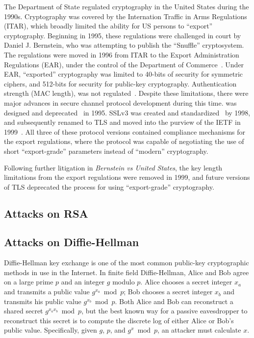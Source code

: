 
The Department of State regulated cryptography in the United States during
the 1990s. Cryptography was covered by the Internation Traffic in Arms
Regulations (ITAR), which broadly limited the ability for US persons to
``export'' cryptography. Beginning in 1995, these regulations were challenged
in court by Daniel J. Bernstein, who was attempting to publish the
``Snuffle'' cryptosystem. The regulations were moved in 1996 from ITAR to the
Export Administration Regulations (EAR), under the control of the Department
of Commerce~\cite{djb-case-status}. Under EAR, ``exported'' cryptography was
limited to 40-bits of security for symmetric ciphers, and 512-bits for
security for public-key cryptography. Authentication strength (\eg MAC
length), was not regulated~\cite{ear-2001-cat-5}. Despite these limitations,
there were major advances in secure channel protocol development during this time.
\ssltwo was designed and deprecated~\cite{sslv2} in 1995. SSLv3 was created and
standardized~\cite{rfc6101} by 1998, and subsequently renamed to TLS and
moved into the purview of the IETF in 1999~\cite{rfc2246}. All three of these
protocol versions contained compliance mechanisms for the export regulations,
where the protocol was capable of negotiating the use of short
``export-grade'' parameters instead of ``modern'' cryptography.

Following further litigation in \textit{Bernstein vs United States}, the key
length limitations from the export regulations were removed in 1999, and
future versions of TLS deprecated the process for using ``export-grade''
cryptography.

\subsection{Attacks on RSA}



\subsection{Attacks on Diffie-Hellman}

Diffie-Hellman key exchange is one of the most common public-key
cryptographic methods in use in the Internet. In finite field Diffie-Hellman,
Alice and Bob agree on a large prime $p$ and an integer $g$ modulo $p$. Alice
chooses a secret integer $x_a$ and transmits a public value $g^{x_a} \bmod
p$; Bob chooses a secret integer $x_b$ and transmits his public value
$g^{x_b} \bmod p$. Both Alice and Bob can reconstruct a shared secret $g^{x_a
x_b} \bmod p$, but the best known way for a passive eavesdropper to
reconstruct this secret is to compute the discrete log of either Alice or
Bob's public value. Specifically, given $g$, $p$, and $g^x \bmod p$, an
attacker must calculate $x$.

